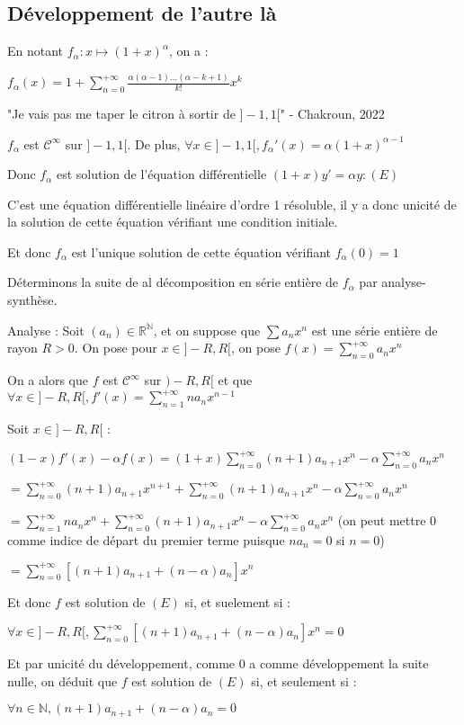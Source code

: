 \documentclass[a4paper,12pt]{book}
\newcommand{\Pre}[1]{\begin{tcolorbox}[sharp corners, colback=white,colframe=green!60!green!30!black!75, title=Preuve]#1\end{tcolorbox}}
\def\R{\mathbb{R}}
\def\N{\mathbb{N}}
\begin{document}
\subsection{Développement de l'autre là}
En notant $f_\alpha :x\mapsto (1+x)^\alpha$, on a :
\par \begin{center} $f_\alpha(x)=1+\sum\limits_{n=0}^{+\infty}\frac{\alpha(\alpha-1)...(\alpha-k+1)}{k!}x^k$ \end{center}
\par "Je vais pas me taper le citron à sortir de $]-1,1[$" - Chakroun, 2022
\Pre{$f_\alpha$ est $\mathcal{C}^\infty$ sur $]-1,1[$. De plus, $\forall x\in]-1,1[, f_\alpha'(x) = \alpha(1+x)^{\alpha-1}$
\par Donc $f_\alpha$ est solution de l'équation différentielle $(1+x)y'=\alpha y : (E)$ \par C'est une équation différentielle linéaire d'ordre 1 résoluble, il y a donc unicité de la solution de cette équation vérifiant une condition initiale. \par Et donc $f_\alpha$ est l'unique solution de cette équation vérifiant $f_\alpha(0)=1$
\par Déterminons la suite de al décomposition en série entière de $f_\alpha$ par analyse-synthèse. \par Analyse : Soit $(a_n)\in\R^\N$, et on suppose que $\sum a_nx^n$ est une série entière de rayon $R>0$. On pose pour $x\in]-R,R[$, on pose $f(x)=\sum\limits_{n=0}^{+\infty}a_nx^n$
\par On a alors que $f$ est $\mathcal{C}^\infty$ sur $)-R,R[$ et que $\forall x\in ]-R,R[, f'(x) = \sum\limits_{n=1}^{+\infty}na_nx^{n-1}$
\par Soit $x\in]-R,R[$ : \par $(1-x)f'(x)-\alpha f(x) =(1+x) \sum\limits_{n=0}^{+\infty} (n+1)a_{n+1}x^n - \alpha \sum\limits_{n=0}^{+\infty}a_nx^n$ \par $=\sum\limits_{n=0}^{+\infty}(n+1)a_{n+1}x^{n+1} + \sum\limits_{n=0}^{+\infty}(n+1)a_{n+1}x^n -\alpha\sum\limits_{n=0}^{+\infty}a_nx^n$ \par $=\sum\limits_{n=1}^{+\infty}na_nx^n + \sum\limits_{n=0}^{+\infty}(n+1)a_{n+1}x^n -\alpha \sum\limits_{n=0}^{+\infty} a_nx^n$ (on peut mettre 0 comme indice de départ du premier terme puisque $na_n =0$ si $n=0$)
\par $=\sum\limits_{n=0}^{+\infty}\left[(n+1)a_{n+1}+(n-\alpha)a_n\right]x^n$ \par Et donc $f$ est solution de $(E)$ si, et suelement si : \par $\forall x\in]-R,R[, \sum\limits_{n=0}^{+\infty}[(n+1)a_{n+1}+(n-\alpha)a_n]x^n=0$ \par Et par unicité du développement, comme $0$ a comme développement la suite nulle, on déduit que $f$ est solution de $(E)$ si, et seulement si :\par $\forall n\in\N, (n+1)a_{n+1}+(n-\alpha)a_n=0$
}
\end{document}
